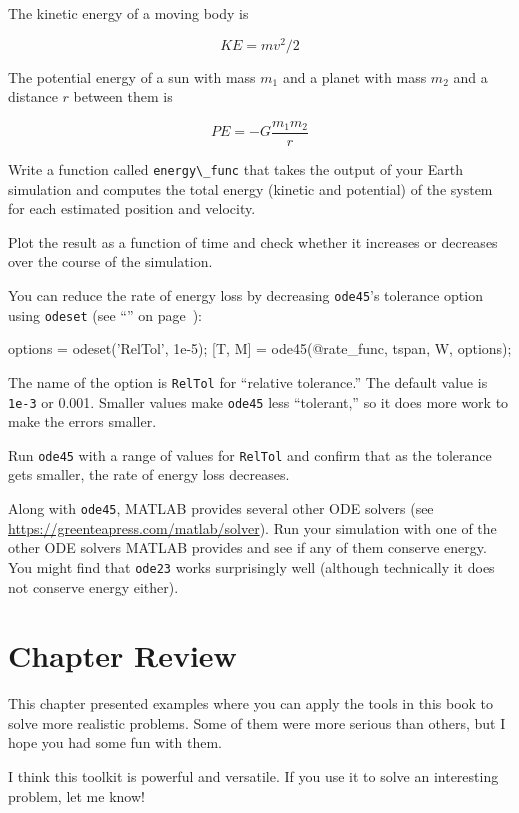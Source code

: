 
The kinetic energy of a moving body is

\begin{equation*}
KE = m v^2 / 2
\end{equation*}

The potential energy of a sun with mass $m_1$ and a
planet with mass $m_2$ and a distance $r$ between them is

\begin{equation*}
PE = -G \frac{m_1 m_2}{r}
\end{equation*}

Write a function called \lstinline{energy\_func} that takes the output of
your Earth simulation and computes the total
energy (kinetic and potential) of the system for each estimated
position and velocity.

Plot the result as a function of time and
check whether it increases or decreases over the course of the simulation.


You can reduce the rate of energy loss by decreasing \lstinline{ode45}'s
tolerance option using \lstinline{odeset} (see ``'' on page~\pageref{events}):

\begin{code}
options = odeset('RelTol', 1e-5);
[T, M] = ode45(@rate_func, tspan, W, options);
\end{code}

The name of the option is \lstinline{RelTol} for ``relative tolerance.''
The default value is \lstinline{1e-3} or 0.001.  Smaller values
make \lstinline{ode45} less ``tolerant,'' so it does more work to
make the errors smaller.


Run \lstinline{ode45} with a range of values for \lstinline{RelTol} and confirm
that as the tolerance gets smaller, the rate of energy loss
decreases.


Along with \lstinline{ode45}, MATLAB provides several other ODE solvers 
(see \url{https://greenteapress.com/matlab/solver}).
Run your simulation with one of the other ODE solvers MATLAB provides
and see if any of them conserve energy.  You might find that \lstinline{ode23} works surprisingly well (although technically it does not conserve energy either).


\section{Chapter Review}

This chapter presented examples where you can apply the tools in this book to solve more realistic problems.  Some of them were more serious than others, but I hope you had some fun with them.

I think this toolkit is powerful and versatile.  If you use it to solve an interesting problem, let me know!



